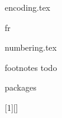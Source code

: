 \usepackage[parent]{currfile}
\usepackage{currfile-abspath}



{encoding.tex}




%
%
{fr}


%
%
{numbering.tex}


%
%
{footnotes}
{todo}



\usepackage{hyperref}

\usepackage{graphicx}
\usepackage{caption}

\usepackage{fancybox,framed}

{packages}



\usepackage{color}
\usepackage{listings}

\lstset{frame=single}

\lstset{language=C}

[1][]
{
    \lstset{language=tex}
    \lstset{#1} %
}
{
}

\lstset{%
    frame = single,
    basicstyle = \ttfamily\small,
    language = C
}




\usepackage{fourier} %


